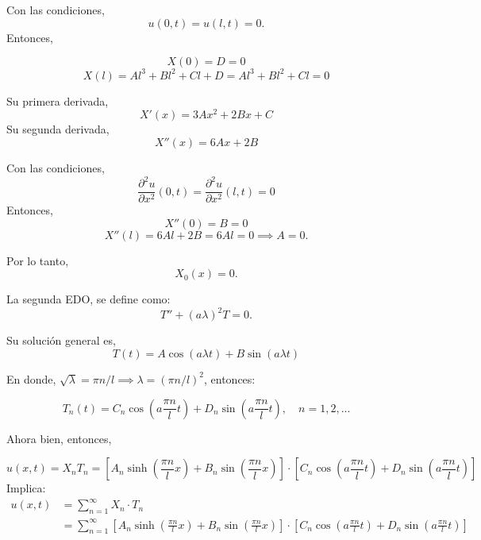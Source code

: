 \begin{solution}
Con las condiciones, 
$$u(0,t)=u(l,t)=0.$$
Entonces,

$$X(0)=D=0$$
$$X(l)=Al^3+Bl^2+Cl+D=Al^3+Bl^2+Cl=0$$

\lineata 

Su primera derivada, 
$$X'(x)=3Ax^2+2Bx+C$$
Su segunda derivada,
$$X''(x)=6Ax+2B$$

\lineata

Con las condiciones, 
$$\frac{\partial^{2} u}{\partial x^{2}}(0, t)=\frac{\partial^{2} u}{\partial x^{2}}(l, t)=0$$
Entonces,
$$X''(0)=B=0$$
$$X''(l)=6Al+2B=6Al=0\implies A=0.$$

Por lo tanto, $$X_0(x)=0.$$ 


\linea 

La segunda EDO, se define como: 
$$T''+(a\lambda)^2T=0.$$

Su solución general es, 
$$T(t)=A\cos(a\lambda t)+B\sin(a\lambda t)$$

En donde, $\sqrt{\lambda}=\pi n / l\implies \lambda=\left(\pi n / l\right)^2$, entonces:

$$T_n(t)=C_n\cos\left(a\frac{\pi n}{l} t\right)+D_n\sin\left(a\frac{\pi n}{l} t\right), \quad n=1,2,...$$

\linea 

Ahora bien, entonces, 

$$u(x,t)= X_nT_n=\left[A_n \sinh\left(\frac{\pi n}{l} x\right)+B_n\sin\left(\frac{\pi n}{l}x\right)\right]\cdot\left[C_n\cos\left(a\frac{\pi n}{l} t\right)+D_n\sin\left(a\frac{\pi n}{l} t\right)\right]$$
Implica: 
\begin{align*}
    u(x,t)&=\sum_{n=1}^\infty X_n\cdot T_n\\
          &= \sum_{n=1}^\infty\left[A_n \sinh\left(\frac{\pi n}{l} x\right)+B_n\sin\left(\frac{\pi n}{l}x\right)\right]\cdot\left[C_n\cos\left(a\frac{\pi n}{l} t\right)+D_n\sin\left(a\frac{\pi n}{l} t\right)\right]
\end{align*}



\end{solution}